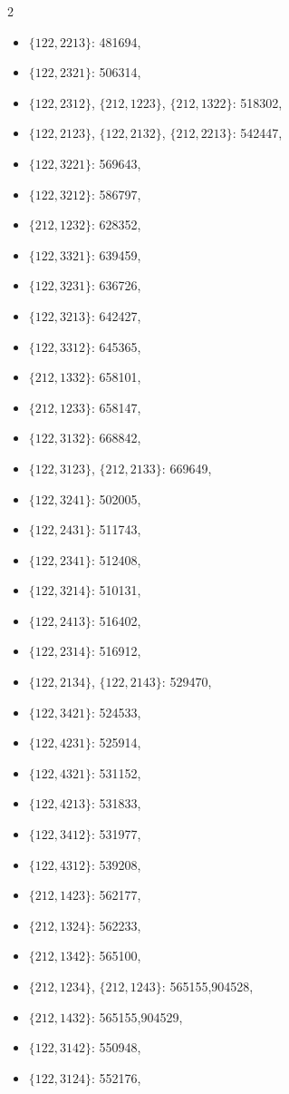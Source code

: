 \documentclass[11pt]{amsart}
\theoremstyle{plain}
\theoremstyle{definition}
\begin{document}
{\begin{multicols}{2}
\begin{itemize}
\item $\{122,2213\}$: 481694,
\item $\{122,2321\}$: 506314,
\item[$\blacksquare$] {$\{122,2312\}$, $\{212,1223\}$, $\{212,1322\}$}: 518302,
\item[$\blacksquare$] {$\{122,2123\}$, $\{122,2132\}$, $\{212,2213\}$}: 542447,
\item $\{122,3221\}$: 569643,
\item $\{122,3212\}$: 586797,
\item $\{212,1232\}$: 628352,
\item $\{122,3321\}$: 639459,
\item $\{122,3231\}$: 636726,
\item $\{122,3213\}$: 642427,
\item $\{122,3312\}$: 645365,
\item $\{212,1332\}$: 658101,
\item $\{212,1233\}$: 658147,
\item $\{122,3132\}$: 668842,
\item[$\blacksquare$] {$\{122,3123\}$, $\{212,2133\}$}: 669649,
\item $\{122,3241\}$: 502005,
\item $\{122,2431\}$: 511743,
\item $\{122,2341\}$: 512408,
\item $\{122,3214\}$: 510131,
\item $\{122,2413\}$: 516402,
\item $\{122,2314\}$: 516912,
\item[$\blacksquare$] $\{122,2134\}$, $\{122,2143\}$: 529470,
\item $\{122,3421\}$: 524533,
\item $\{122,4231\}$: 525914,
\item $\{122,4321\}$: 531152,
\item $\{122,4213\}$: 531833,
\item $\{122,3412\}$: 531977,
\item $\{122,4312\}$: 539208,
\item $\{212,1423\}$: 562177,
\item $\{212,1324\}$: 562233,
\item $\{212,1342\}$: 565100,
\item[$\blacksquare$] $\{212,1234\}$, $\{212,1243\}$: 565155,904528,
\item $\{212,1432\}$: 565155,904529,
\item $\{122,3142\}$: 550948,
\item $\{122,3124\}$: 552176,

\end{itemize}
\end{multicols}}
\end{document}
